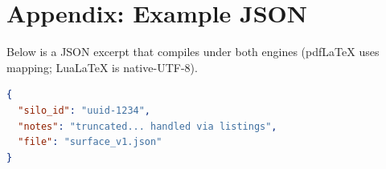 \documentclass[11pt]{article}
\begin{document}
\appendix
\section{Appendix: Example JSON}
Below is a JSON excerpt that compiles under both engines (pdfLaTeX uses mapping; LuaLaTeX is native-UTF-8).

\begin{lstlisting}[language=json,caption={Example payload}]
{
  "silo_id": "uuid-1234",
  "notes": "truncated... handled via listings",
  "file": "surface_v1.json"
}
\end{lstlisting}
\end{document}
